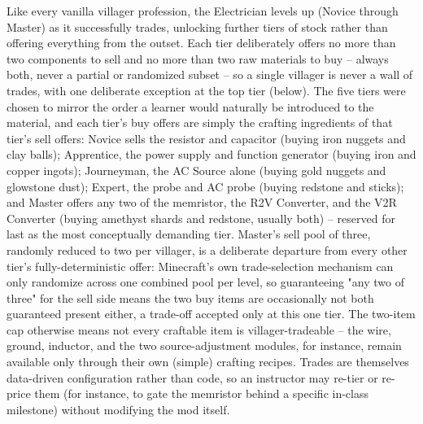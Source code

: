Like every vanilla villager profession, the Electrician levels up (Novice through Master)
as it successfully trades, unlocking further tiers of stock rather than offering everything
from the outset. Each tier deliberately offers no more than two components to sell and no
more than two raw materials to buy -- always both, never a partial or randomized subset --
so a single villager is never a wall of trades, with one deliberate exception at the top tier
(below). The five tiers were chosen to mirror the order a learner would naturally be
introduced to the material, and each tier's buy offers are simply the crafting ingredients of
that tier's sell offers: Novice sells the resistor and capacitor (buying iron nuggets and clay
balls); Apprentice, the power supply and function generator (buying iron and copper ingots);
Journeyman, the AC Source alone (buying gold nuggets and glowstone dust); Expert, the probe
and AC probe (buying redstone and sticks); and Master offers any two of the memristor, the R2V
Converter, and the V2R Converter (buying amethyst shards and redstone, usually both) --
reserved for last as the most conceptually demanding tier. Master's sell pool of three,
randomly reduced to two per villager, is a deliberate departure from every other tier's
fully-deterministic offer: Minecraft's own trade-selection mechanism can only randomize
across one combined pool per level, so guaranteeing "any two of three" for the sell side means
the two buy items are occasionally not both guaranteed present either, a trade-off accepted
only at this one tier. The two-item cap otherwise means not every craftable item is
villager-tradeable -- the wire, ground, inductor, and the two source-adjustment modules, for
instance, remain available only through their own (simple) crafting recipes. Trades are
themselves data-driven configuration rather than code, so an instructor may re-tier or
re-price them (for instance, to gate the memristor behind a specific in-class milestone)
without modifying the mod itself.
